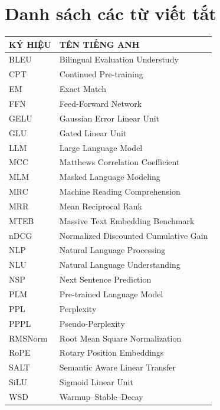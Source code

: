 \chapter*{Danh sách các từ viết tắt}
{}
\label{abbreviations}

\begin{singlespace}
\begin{center}
  \small
  \renewcommand{\arraystretch}{1.25}
  \begin{tabular}{ll}
    \hline
    \textbf{KÝ HIỆU} & \textbf{TÊN TIẾNG ANH} \\
    \hline
    BLEU    & Bilingual Evaluation Understudy \\
    CPT     & Continued Pre-training \\
    EM      & Exact Match \\
    FFN     & Feed-Forward Network \\
    GELU    & Gaussian Error Linear Unit \\
    GLU     & Gated Linear Unit \\
    LLM     & Large Language Model \\
    MCC     & Matthews Correlation Coefficient \\
    MLM     & Masked Language Modeling \\
    MRC     & Machine Reading Comprehension \\
    MRR     & Mean Reciprocal Rank \\
    MTEB    & Massive Text Embedding Benchmark \\
    nDCG    & Normalized Discounted Cumulative Gain \\
    NLP     & Natural Language Processing \\
    NLU     & Natural Language Understanding \\
    NSP     & Next Sentence Prediction \\
    PLM     & Pre-trained Language Model \\
    PPL     & Perplexity \\
    PPPL    & Pseudo-Perplexity \\
    RMSNorm & Root Mean Square Normalization \\
    RoPE    & Rotary Position Embeddings \\
    SALT    & Semantic Aware Linear Transfer \\
    SiLU    & Sigmoid Linear Unit \\
    WSD     & Warmup--Stable--Decay \\
    \hline
  \end{tabular}
\end{center}
\end{singlespace}
